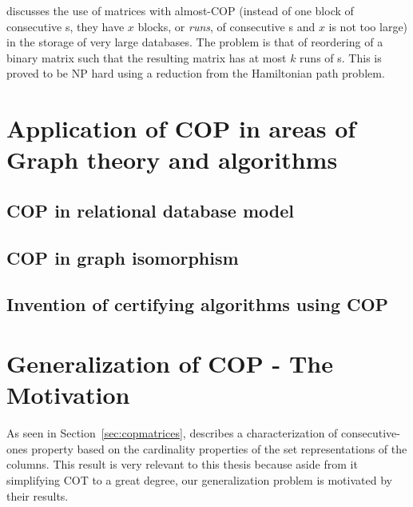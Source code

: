 \documentclass[MS]             %
              {iitmdiss_as}    %
\begin{document}
\cite{jkckv04} discusses the use of matrices with almost-COP (instead
of one block of consecutive {\un}s, they have $x$ blocks, or {\em
  runs}, of consecutive {\un}s and $x$ is not too large) in the
storage of very large databases.  The problem is that of reordering of
a binary matrix such that the resulting matrix has at most $k$ runs of
{\un}s. This is proved to be NP hard using a reduction from the
Hamiltonian path problem.
  



\section{Application of COP in areas of Graph theory and algorithms}
\subsection{COP in relational database model}
\subsection{COP in graph isomorphism}
\subsection{Invention of certifying algorithms using COP}


\section{Generalization of COP - The Motivation}  %
\label{sec:motive}
As seen in Section~\ref{sec:copmatrices}, \cite{nsnrs09} describes a
characterization of consecutive-ones property based on the cardinality
properties of the set representations of the columns. This result is
very relevant to this thesis because aside from it simplifying COT to
a great degree, our generalization problem is motivated by their
results.
\end{document}
